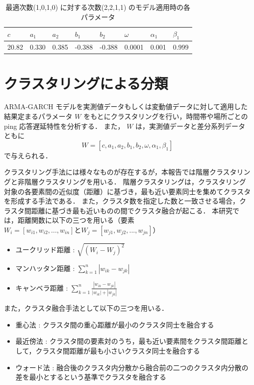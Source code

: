 \documentclass[a4j]{jarticle}
\begin{document}
\begin{table}[h]
\centering
\caption{最適次数(1,0,1,0) に対する次数(2,2,1,1) のモデル適用時の各パラメータ}
\label{par}
\begin{tabular}{|l|l|l|l|l|l|l|l|}
\hline
$c$&$a_1$&$a_2$&$b_1$&$b_2$&$\omega$&$\alpha_1$&$\beta_1$\\
\hline
20.82&0.330&0.385&-0.388&-0.388&0.0001&0.001&0.999\\
\hline
\end{tabular}
\end{table}

\section{クラスタリングによる分類}
 ARMA-GARCH モデルを実測値データもしくは変動値データに対して適用した結果定まるパラメータ $W$ をもとにクラスタリングを行い，時間帯や場所ごとの ping 応答遅延特性を分析する．
また， $W$ は，実測値データと差分系列データともに
$$W = [c, a_1, a_2, b_1, b_2, \omega, \alpha_1, \beta_1] $$
で与えられる．

クラスタリング手法には様々なものが存在するが，本報告では階層クラスタリングと非階層クラスタリングを用いる．
階層クラスタリングは，クラスタリング対象の各要素間の近似度（距離）に基づき，最も近い要素同士を集めてクラスタを形成する手法である．
また，クラスタ数を指定した数と一致させる場合，クラスタ間距離に基づき最も近いものの間でクラスタ融合が起こる．
本研究では，距離関数に以下の三つを用いる（要素 $W_i = [w_{i1},w_{i2},...,w_{in}] と W_j = [w_{j1},w_{j2},...,w_{jn}]$）
\begin{itemize}
\item ユークリッド距離 : $\sqrt{( W_i - W_j )^2}$
\item マンハッタン距離 : $\sum^n_{k=1} |w_{ik}-w_{jk}| $
\item キャンベラ距離 : $\sum^n_{k=1}\frac{|w_{ik}-w_{jk}|}{|w_{ik}|+|w_{jk}|} $
\end{itemize}
また，クラスタ融合手法として以下の三つを用いる．
\begin{itemize}
\item 重心法 : クラスタ間の重心距離が最小のクラスタ同士を融合する
\item 最近傍法 : クラスタ間の要素対のうち，最も近い要素間をクラスタ間距離として，クラスタ間距離が最も小さいクラスタ同士を融合する
\item ウォード法 : 融合後のクラスタ内分散から融合前の二つのクラスタ内分散の差を最小とするという基準でクラスタを融合する
\end{itemize}
\end{document}
